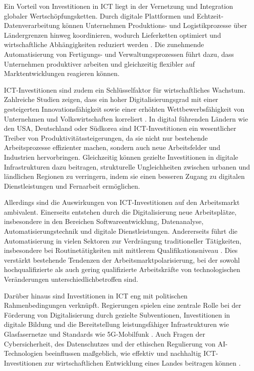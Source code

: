 Ein Vorteil von Investitionen in \ac{ICT} liegt in der Vernetzung und Integration globaler 
Wertschöpfungsketten. Durch digitale Plattformen und Echtzeit-Datenverarbeitung können 
Unternehmen Produktions- und Logistikprozesse über Ländergrenzen hinweg koordinieren, 
wodurch Lieferketten optimiert und wirtschaftliche Abhängigkeiten reduziert werden 
\parencite[S. 48]{oecd2019measuring}. Die zunehmende Automatisierung von Fertigungs- und 
Verwaltungsprozessen führt dazu, dass Unternehmen produktiver arbeiten und gleichzeitig 
flexibler auf Marktentwicklungen reagieren können.

\ac{ICT}-Investitionen sind zudem ein Schlüsselfaktor für wirtschaftliches Wachstum. 
Zahlreiche Studien zeigen, dass ein hoher Digitalisierungsgrad mit einer gesteigerten 
Innovationsfähigkeit sowie einer erhöhten Wettbewerbsfähigkeit von Unternehmen und 
Volkswirtschaften korreliert \parencite[S. 22]{brynjolfsson2015thesecond}. In digital 
führenden Ländern wie den USA, Deutschland oder Südkorea sind \ac{ICT}-Investitionen 
ein wesentlicher Treiber von Produktivitätssteigerungen, da sie nicht nur bestehende 
Arbeitsprozesse effizienter machen, sondern auch neue Arbeitsfelder und Industrien 
hervorbringen. Gleichzeitig können gezielte Investitionen in digitale Infrastrukturen 
dazu beitragen, strukturelle Ungleichheiten zwischen urbanen und ländlichen Regionen 
zu verringern, indem sie einen besseren Zugang zu digitalen Dienstleistungen und Fernarbeit 
ermöglichen.

Allerdings sind die Auswirkungen von \ac{ICT}-Investitionen auf den Arbeitsmarkt 
ambivalent. Einerseits entstehen durch die Digitalisierung neue Arbeitsplätze, 
insbesondere in den Bereichen Softwareentwicklung, Datenanalyse, Automatisierungstechnik 
und digitale Dienstleistungen. Andererseits führt die Automatisierung in vielen Sektoren 
zur Verdrängung traditioneller Tätigkeiten, insbesondere bei Routinetätigkeiten mit 
mittlerem Qualifikationsniveau \parencite[S. 40]{frey2016thefuture}. Dies verstärkt 
bestehende Tendenzen der Arbeitsmarktpolarisierung, bei der sowohl hochqualifizierte als 
auch gering qualifizierte Arbeitskräfte von technologischen Veränderungen 
unterschiedlichbetroffen sind.

Darüber hinaus sind Investitionen in \ac{ICT} eng mit politischen Rahmenbedingungen 
verknüpft. Regierungen spielen eine zentrale Rolle bei der Förderung von Digitalisierung 
durch gezielte Subventionen, Investitionen in digitale Bildung und die Bereitstellung 
leistungsfähiger Infrastrukturen wie Glasfasernetze und Standards wie 5G-Mobilfunk 
\parencite[S. 45]{oecd2020digital}. Auch Fragen der Cybersicherheit, des Datenschutzes und 
der ethischen Regulierung von \ac{AI}-Technologien beeinflussen maßgeblich, wie effektiv 
und nachhaltig \ac{ICT}-Investitionen zur wirtschaftlichen Entwicklung eines Landes 
beitragen können \parencite[S. 45]{oecd2020digital}. 


